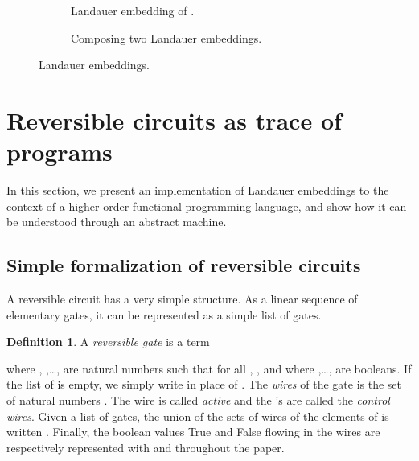 \documentclass{article}
\theoremstyle{plain}
\theoremstyle{definition}
\newtheorem{definition}[theorem]{Definition}
\newcommand{\define}[1]{{\em #1}}
\begin{document}
\def\multiline#1#2#3#4{\save
(#1,#4#2);(#3,#2)**\dir{-};
(#1,#4#2.9999);(#3,#4#2.9999)**\dir{-};
(#1,#4#2.5);(#3,#4#2.5)**\dir[|(0.5)]{-};
(#1,#4#2.25);(#3,#4#2.25)**\dir{-};
(#1,#4#2.75);(#3,#4#2.75)**\dir{-};
(#1,#4#2.625);(#3,#4#2.625)**\dir[|(0.5)]{-};
(#1,#4#2.375);(#3,#4#2.375)**\dir[|(0.5)]{-};
(#1,#4#2.55);(#3,#4#2.55)**\dir[|(0.5)]{-};
(#1,#4#2.45);(#3,#4#2.45)**\dir[|(0.5)]{-};
\restore}
\begin{figure}[tb]
\scriptsize\centering
\begin{subfigure}{.35\textwidth}
  \centering
  
  \caption{Landauer embedding of .}
  \label{fig:Tf}
\end{subfigure}
\qquad
\begin{subfigure}{.5\textwidth}
\centering
\caption{Composing two Landauer embeddings.}
\label{fig:TgTh}
\end{subfigure}
\caption{Landauer embeddings.}
\label{fig:class-shape-to-closed}
\end{figure}


\section{Reversible circuits as trace of programs}
\label{sec:progr-revers-circ}

In this section, we present an implementation of Landauer embeddings
to the context of a higher-order functional programming language, and
show how it can be understood through an abstract machine.



\subsection{Simple formalization of reversible circuits}

A reversible circuit has a very simple structure. As a linear sequence
of elementary gates, it can be represented as a simple list of gates.

\begin{definition}\rm
  A \define{reversible gate}  is a term 
  
  where , ,\ldots, are natural numbers such that for all
  , , and where ,\ldots, are booleans. If the list of
   is empty, we simply write  in place of
  .
The \define{wires} of the gate
   is the set of natural
  numbers . The wire  is called
  \define{active} and the 's are called the \define{control
    wires}.
Given a list  of gates, the union of
  the sets of wires of the elements of  is written .
  Finally, the boolean values True and False flowing in the wires are
  respectively represented with  and  throughout the paper.
\end{definition}
\end{document}
